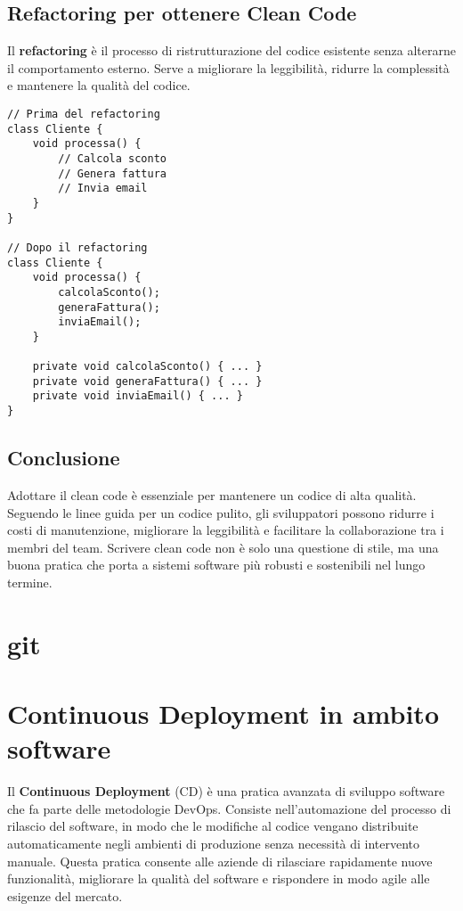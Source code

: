 \documentclass{article}
\begin{document}
\subsection{Refactoring per ottenere Clean Code}
Il \textbf{refactoring} è il processo di ristrutturazione del codice esistente senza alterarne il comportamento esterno. Serve a migliorare la leggibilità, ridurre la complessità e mantenere la qualità del codice.

\begin{lstlisting}
// Prima del refactoring
class Cliente {
    void processa() {
        // Calcola sconto
        // Genera fattura
        // Invia email
    }
}

// Dopo il refactoring
class Cliente {
    void processa() {
        calcolaSconto();
        generaFattura();
        inviaEmail();
    }
    
    private void calcolaSconto() { ... }
    private void generaFattura() { ... }
    private void inviaEmail() { ... }
}
\end{lstlisting}

\subsection{Conclusione}
Adottare il clean code è essenziale per mantenere un codice di alta qualità. Seguendo le linee guida per un codice pulito, gli sviluppatori possono ridurre i costi di manutenzione, migliorare la leggibilità e facilitare la collaborazione tra i membri del team. Scrivere clean code non è solo una questione di stile, ma una buona pratica che porta a sistemi software più robusti e sostenibili nel lungo termine.


\section{git}
\section{Continuous Deployment in ambito software}

Il \textbf{Continuous Deployment} (CD) è una pratica avanzata di sviluppo software che fa parte delle metodologie DevOps. Consiste nell'automazione del processo di rilascio del software, in modo che le modifiche al codice vengano distribuite automaticamente negli ambienti di produzione senza necessità di intervento manuale. Questa pratica consente alle aziende di rilasciare rapidamente nuove funzionalità, migliorare la qualità del software e rispondere in modo agile alle esigenze del mercato.
\end{document}
